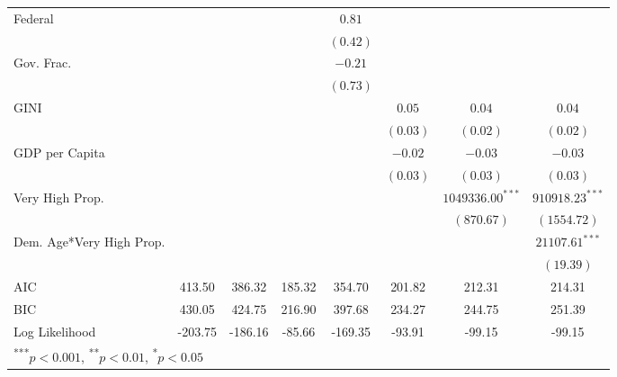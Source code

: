 \documentclass[a4paper]{article}\usepackage{graphicx, color}
\begin{document}
\begin{table}
\begin{center}
\begin{tabular}{l c c c c c c c }
Federal                  &               &               &               & $0.81$        &               &                    &                   \\
                         &               &               &               & $(0.42)$      &               &                    &                   \\
Gov. Frac.               &               &               &               & $-0.21$       &               &                    &                   \\
                         &               &               &               & $(0.73)$      &               &                    &                   \\
GINI                     &               &               &               &               & $0.05$        & $0.04$             & $0.04$            \\
                         &               &               &               &               & $(0.03)$      & $(0.02)$           & $(0.02)$          \\
GDP per Capita           &               &               &               &               & $-0.02$       & $-0.03$            & $-0.03$           \\
                         &               &               &               &               & $(0.03)$      & $(0.03)$           & $(0.03)$          \\
Very High Prop.          &               &               &               &               &               & $1049336.00^{***}$ & $910918.23^{***}$ \\
                         &               &               &               &               &               & $(870.67)$         & $(1554.72)$       \\
Dem. Age*Very High Prop. &               &               &               &               &               &                    & $21107.61^{***}$  \\
                         &               &               &               &               &               &                    & $(19.39)$         \\
\hline
AIC                      & 413.50        & 386.32        & 185.32        & 354.70        & 201.82        & 212.31             & 214.31            \\
BIC                      & 430.05        & 424.75        & 216.90        & 397.68        & 234.27        & 244.75             & 251.39            \\
Log Likelihood           & -203.75       & -186.16       & -85.66        & -169.35       & -93.91        & -99.15             & -99.15            \\
\hline
\multicolumn{8}{l}{\scriptsize{\textsuperscript{***}$p<0.001$, 
  \textsuperscript{**}$p<0.01$, 
  \textsuperscript{*}$p<0.05$}}
\end{tabular}



\end{center}
\end{table}
\end{document}
